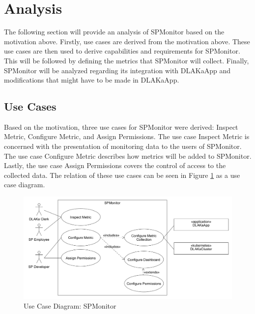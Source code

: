 \section{Analysis}
\label{sec:analysis}

The following section will provide an analysis of SPMonitor based on the motivation above.
Firstly, use cases are derived from the motivation above. These use cases are then used
to derive capabilities and requirements for SPMonitor. This will be followed by defining
the metrics that SPMonitor will collect. Finally, SPMonitor will be analyzed regarding its
integration with DLAKaApp and modifications that might have to be made in DLAKaApp.

\subsection{Use Cases}

Based on the motivation, three use cases for SPMonitor were derived: Inspect Metric, Configure Metric, and Assign Permissions.
The use case Inspect Metric is concerned with the presentation of monitoring data to the users of SPMonitor.
The use case Configure Metric describes how metrics will be added to SPMonitor.
Lastly, the use case Assign Permissions covers the control of access to the collected data.
The relation of these use cases can be seen in Figure \ref{fig:use_case_diagram_spmonitor} as a use case diagram.

\begin{figure}
	\centering
	\includegraphics[width=\textwidth]{figures/2.1_use_case_spmonitor.png}
	\caption{Use Case Diagram: SPMonitor}
	\label{fig:use_case_diagram_spmonitor}
\end{figure}

